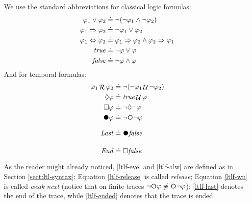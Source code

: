 We use the standard abbreviations for classical logic formulas:
\begin{align*}
	\varphi_1\lor\varphi_2 &\doteq \lnot(\lnot \varphi_1\land \lnot
	\varphi_2)\\
	\varphi_1 \Rightarrow \varphi_2 &\doteq \lnot \varphi_1 \vee \varphi_2\\
	\varphi_1 \Leftrightarrow \varphi_2 &\doteq \varphi_1 \Rightarrow \varphi_2 \wedge \varphi_2 \Rightarrow \varphi_1\\
	\mathit{true}  &\doteq \lnot \varphi \vee \varphi\\
	\mathit{false} &\doteq \lnot \varphi \wedge \varphi\\
\end{align*}
And for temporal formulas:
\begin{align}
\varphi_1 \Release \varphi_2 &\doteq \lnot (\lnot \varphi_1 \lUntil \lnot \varphi_2) \label{ltlf-release}\\
\Diamond\varphi &\doteq \true\lUntil\varphi \label{ltlf-eve}\\
\Box\varphi &\doteq\lnot\Diamond\lnot\varphi \label{ltlf-alw}\\
\Wnext \varphi &\doteq \lnot \Next \lnot \varphi \label{ltlf-wn}\\
\Last &\doteq \Wnext\false \label{ltlf-last}\\
\Ended &\doteq \Box\false \label{ltlf-ended}
\end{align}
As the reader might already noticed, \ref{ltlf-eve} and \ref{ltlf-alw} are defined as in Section \ref{sect:ltl-syntax};  Equation \ref{ltlf-release} is called \emph{release}; Equation \ref{ltlf-wn} is called \emph{weak next} (notice that on finite traces $\lnot \Next \varphi \not\equiv \Next \lnot \varphi$); \ref{ltlf-last} denotes the end of the trace, while \ref{ltlf-ended} denotes that the trace is ended.

